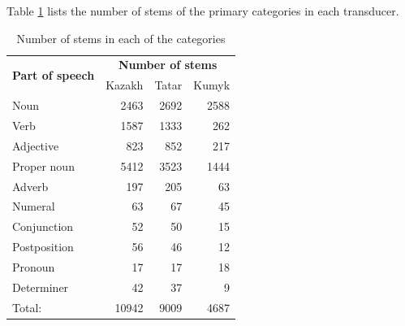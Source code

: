 \documentclass[a4paper,11pt,twocolumn]{article}
\begin{document}
Table \ref{table:stems} lists the number of stems of the primary categories in each transducer.

\begin{table}
\begin{center}
\begin{tabular}{lrrr}
		\toprule
\multirow{2}{*}{\textbf{Part of speech}} & \multicolumn{3}{c}{\textbf{Number of stems}} \\ \cline{2-4}
                        & Kazakh & Tatar & Kumyk \\
		\midrule
		Noun & 2463 & 2692 & 2588 \\
		Verb & 1587 & 1333 & 262 \\
		Adjective & 823 & 852 & 217 \\
		Proper noun & 5412 & 3523 & 1444 \\
		Adverb & 197 & 205 & 63 \\
		Numeral & 63 & 67 & 45 \\
		Conjunction & 52 & 50 & 15 \\
		Postposition & 56 & 46 & 12 \\
		Pronoun & 17 & 17 & 18 \\
		Determiner & 42 & 37 & 9 \\
		\midrule
		Total: & 10942 & 9009 & 4687 \\
		\bottomrule
\end{tabular}
 \caption{Number of stems in each of the categories}
 \label{table:stems}
\end{center}

\end{table}

\end{document}
